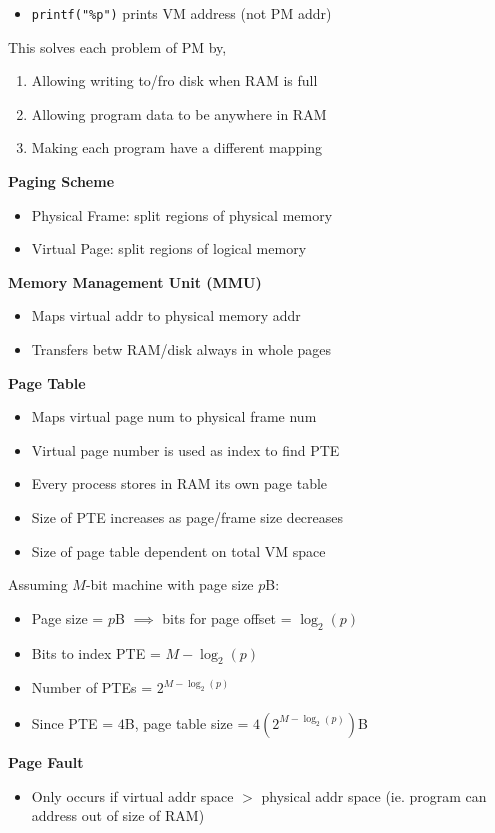 \documentclass[a4paper, 12pt]{article}
\begin{document}
\begin{multicols*}{4}
\begin{itemize}
	\item \texttt{printf("\%p")} prints VM address (not PM addr)
\end{itemize}
This solves each problem of PM by,
\begin{enumerate}
	\item Allowing writing to/fro disk when RAM is full
	\item Allowing program data to be anywhere in RAM
	\item Making each program have a different mapping
\end{enumerate}
\textbf{Paging Scheme}
\begin{itemize}
	\item Physical Frame: split regions of physical memory
	\item Virtual Page: split regions of logical memory
\end{itemize}
\textbf{Memory Management Unit (MMU)}
\begin{itemize}
	\item Maps virtual addr to physical memory addr 
	\item Transfers betw RAM/disk always in whole pages
\end{itemize}
\textbf{Page Table}
\begin{itemize}
	\item Maps virtual page num to physical frame num
	\item Virtual page number is used as index to find PTE
	\item Every process stores in RAM its own page table
	\item Size of PTE increases as page/frame size decreases
	\item Size of page table dependent on total VM space
\end{itemize}
Assuming $M$-bit machine with page size $p$B:
\begin{itemize}
	\item Page size = $p$B $\implies$ bits for page offset = $\log_2(p)$
	\item Bits to index PTE = $M-\log_2(p)$
	\item Number of PTEs = $2^{M-\log_2(p)}$
	\item Since PTE = $4$B, page table size = $4(2^{M-\log_2(p)})$B
\end{itemize}
\textbf{Page Fault}
\begin{itemize}
	\item Only occurs if virtual addr space $>$ physical addr space (ie. program can address out of size of RAM)
\end{itemize}

\end{multicols*}
\end{document}
